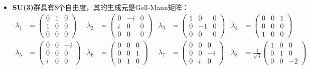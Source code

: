 \begin{itemize}
        \begin{equation}
        U(\boldsymbol{\theta}) = e^{i\boldsymbol{\theta}\cdot\boldsymbol{\sigma}}
    \end{equation}
    其中泡利矩阵$\boldsymbol{\sigma}$即为SU(2)群的生成元，且满足SU(2)群李代数：
    \begin{equation}
        [\sigma_i, \sigma_j] = i\varepsilon_{ijk}\sigma_k
    \end{equation}
    由于SU(2)群和SO(3)群都具有相同的三个自由度，且具有相同结构常数，因此SU(2)群同构于SO(3)群。然而SU(2)的基础表示维度为2。
    \item\textbf{SU(3)}群具有8个自由度，其的生成元是Gell-Mann矩阵：
    \begin{align}
        \lambda_1&= \begin{pmatrix} 0 & 1 & 0 \\ 1 & 0 & 0 \\ 0 & 0 & 0 \end{pmatrix}& \lambda_2& = \begin{pmatrix} 0 & -i & 0 \\ i & 0 & 0 \\ 0 & 0 & 0 \end{pmatrix} &\lambda_3 &= \begin{pmatrix} 1 & 0 & 0 \\ 0 & -1 & 0 \\ 0 & 0 & 0 \end{pmatrix}&\lambda_4& = \begin{pmatrix} 0 & 0 & 1 \\ 0 & 0 & 0 \\ 1 & 0 & 0 \end{pmatrix}\\
        \lambda_5& = \begin{pmatrix} 0 & 0 & -i \\ 0 & 0 & 0 \\ i & 0 & 0 \end{pmatrix} &\lambda_6& = \begin{pmatrix} 0 & 0 & 0 \\ 0 & 0 & 1 \\ 0 & 1 & 0 \end{pmatrix} &\lambda_7& = \begin{pmatrix} 0 & 0 & 0 \\ 0 & 0 & -i \\ 0 & i & 0 \end{pmatrix} &\lambda_8& = \frac{1}{\sqrt{3}} \begin{pmatrix} 1 & 0 & 0 \\ 0 & 1 & 0 \\ 0 & 0 & -2 \end{pmatrix}

\end{align}
\end{itemize}
